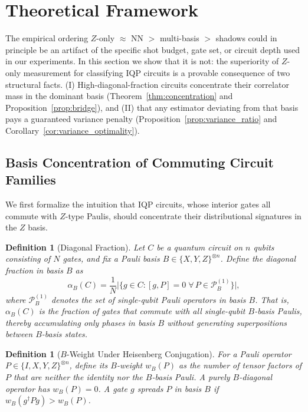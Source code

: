 \documentclass[conference]{IEEEtran}
\newtheorem{definition}[theorem]{Definition}
\newcommand{\nqubits}{n}
\begin{document}
\section{Theoretical Framework}
\label{sec:theory}

The empirical ordering $Z$-only $\approx$ NN $>$ multi-basis $>$ shadows could in principle be an artifact of the specific shot budget, gate set, or circuit depth used in our experiments.
In this section we show that it is not: the superiority of $Z$-only measurement for classifying IQP circuits is a provable consequence of two structural facts. (I) High-diagonal-fraction circuits concentrate their correlator mass in the dominant basis (Theorem~\ref{thm:concentration} and Proposition~\ref{prop:bridge}), and (II) that any estimator deviating from that basis pays a guaranteed variance penalty (Proposition~\ref{prop:variance_ratio} and Corollary~\ref{cor:variance_optimality}).

\subsection{Basis Concentration of Commuting Circuit Families}

We first formalize the intuition that IQP circuits, whose interior gates all commute with $Z$-type Paulis, should concentrate their distributional signatures in the $Z$ basis.

\begin{definition}[Diagonal Fraction]
\label{def:diag_frac}
Let $C$ be a quantum circuit on $\nqubits$ qubits consisting of $N$ gates, and fix a Pauli basis $B \in \{X, Y, Z\}^{\otimes \nqubits}$. Define the \emph{diagonal fraction in basis $B$} as
\[
\alpha_B(C) = \frac{1}{N}\bigl|\{g \in C : [g, P] = 0 \;\forall\, P \in \mathcal{P}_B^{(1)}\}\bigr|,
\]
where $\mathcal{P}_B^{(1)}$ denotes the set of single-qubit Pauli operators in basis $B$. That is, $\alpha_B(C)$ is the fraction of gates that commute with all single-qubit $B$-basis Paulis, thereby accumulating only phases in basis $B$ without generating superpositions between $B$-basis states.
\end{definition}

\begin{definition}[$B$-Weight Under Heisenberg Conjugation]
\label{def:b_weight}
For a Pauli operator $P \in \{I, X, Y, Z\}^{\otimes \nqubits}$, define its \emph{$B$-weight} $w_B(P)$ as the number of tensor factors of $P$ that are neither the identity nor the $B$-basis Pauli. A purely $B$-diagonal operator has $w_B(P) = 0$. A gate $g$ \emph{spreads} $P$ in basis $B$ if $w_B(g^\dagger P g) > w_B(P)$.
\end{definition}
\end{document}
